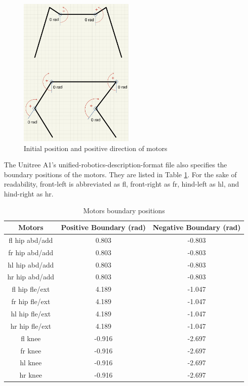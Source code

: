 \begin{figure}[htbp]
   \centering
   \includegraphics[width=0.5\textwidth]{figures/ini_pos_and_positive_direction.png}
   \caption{Initial position and positive direction of motors}
   \label{fig:ini_pos_and_positive_direction}
\end{figure}

The Unitree A1's unified-robotics-description-format file also specifies the boundary positions of the motors. They are listed in Table \ref{table:motors_boundary_positions}. For the sake of readability, front-left is abbreviated as fl, front-right as fr, hind-left as hl, and hind-right as hr.

\begin{table}[htbp]
   \centering
   \caption{Motors boundary positions}
   \begin{tabular}{|c|c|c|}
   \hline
   Motors & Positive Boundary (rad) & Negative Boundary (rad) \\ \hline
   fl hip abd/add &  0.803 & -0.803 \\ \hline
   fr hip abd/add &  0.803 & -0.803 \\ \hline
   hl hip abd/add &  0.803 & -0.803 \\ \hline
   hr hip abd/add &  0.803 & -0.803 \\ \hline
   fl hip fle/ext &  4.189 & -1.047 \\ \hline
   fr hip fle/ext &  4.189 & -1.047 \\ \hline
   hl hip fle/ext &  4.189 & -1.047 \\ \hline
   hr hip fle/ext &  4.189 & -1.047 \\ \hline
   fl knee        & -0.916 & -2.697 \\ \hline
   fr knee        & -0.916 & -2.697 \\ \hline
   hl knee        & -0.916 & -2.697 \\ \hline
   hr knee        & -0.916 & -2.697 \\ \hline
   \end{tabular}
   \label{table:motors_boundary_positions}
\end{table}

